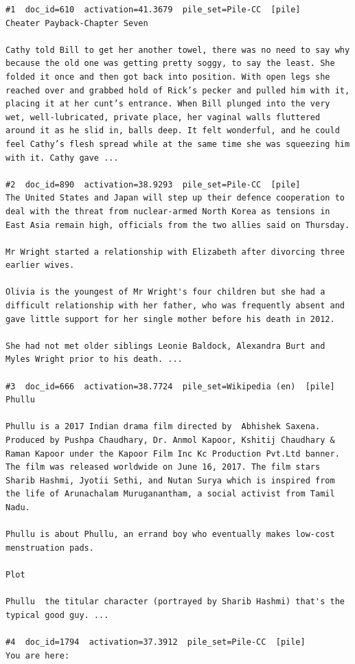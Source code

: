 \begin{verbatim}
#1  doc_id=610  activation=41.3679  pile_set=Pile-CC  [pile]
Cheater Payback-Chapter Seven

Cathy told Bill to get her another towel, there was no need to say why because the old one was getting pretty soggy, to say the least. She folded it once and then got back into position. With open legs she reached over and grabbed hold of Rick’s pecker and pulled him with it, placing it at her cunt’s entrance. When Bill plunged into the very wet, well-lubricated, private place, her vaginal walls fluttered around it as he slid in, balls deep. It felt wonderful, and he could feel Cathy’s flesh spread while at the same time she was squeezing him with it. Cathy gave ...

#2  doc_id=890  activation=38.9293  pile_set=Pile-CC  [pile]
The United States and Japan will step up their defence cooperation to deal with the threat from nuclear-armed North Korea as tensions in East Asia remain high, officials from the two allies said on Thursday.

Mr Wright started a relationship with Elizabeth after divorcing three earlier wives.

Olivia is the youngest of Mr Wright's four children but she had a difficult relationship with her father, who was frequently absent and gave little support for her single mother before his death in 2012.

She had not met older siblings Leonie Baldock, Alexandra Burt and Myles Wright prior to his death. ...

#3  doc_id=666  activation=38.7724  pile_set=Wikipedia (en)  [pile]
Phullu

Phullu is a 2017 Indian drama film directed by  Abhishek Saxena. Produced by Pushpa Chaudhary, Dr. Anmol Kapoor, Kshitij Chaudhary & Raman Kapoor under the Kapoor Film Inc Kc Production Pvt.Ltd banner. The film was released worldwide on June 16, 2017. The film stars Sharib Hashmi, Jyotii Sethi, and Nutan Surya which is inspired from the life of Arunachalam Muruganantham, a social activist from Tamil Nadu. 

Phullu is about Phullu, an errand boy who eventually makes low-cost menstruation pads.

Plot

Phullu  the titular character (portrayed by Sharib Hashmi) that's the typical good guy. ...

#4  doc_id=1794  activation=37.3912  pile_set=Pile-CC  [pile]
You are here:


\end{verbatim}
